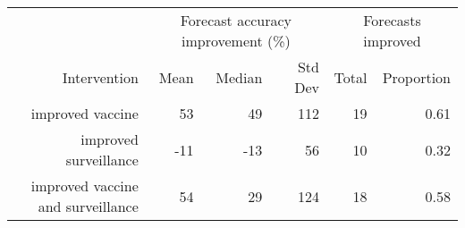 
\begin{tabular*}{1.0\textwidth}{rrrrrr}
\toprule
             & \multicolumn{3}{c}{Forecast accuracy improvement (\%)} & \multicolumn{2}{c}{Forecasts improved} \\
Intervention & Mean & Median & Std Dev & Total & Proportion \\
\midrule

improved vaccine & 53 & 49 & 112 & 19 & 0.61 \\
improved surveillance & -11 & -13 & 56 & 10 & 0.32 \\
improved vaccine and surveillance & 54 & 29 & 124 & 18 & 0.58 \\

\bottomrule
\end{tabular*}

